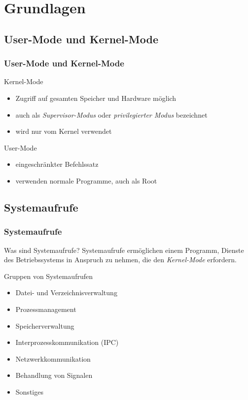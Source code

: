 \section{Grundlagen}

\subsection{User-Mode und Kernel-Mode}

\begin{frame}
  \frametitle{User-Mode und Kernel-Mode}

  \begin{block}{Kernel-Mode}
    \begin{itemize}
      \item Zugriff auf gesamten Speicher und Hardware möglich
      \item auch als \emph{Supervisor-Modus} oder \emph{privilegierter Modus} bezeichnet
      \item wird nur vom Kernel verwendet
    \end{itemize}
  \end{block}

  \begin{block}{User-Mode}
    \begin{itemize}
      \item eingeschränkter Befehlssatz
      \item verwenden normale Programme, auch als Root
    \end{itemize}
  \end{block}
\end{frame}

\subsection{Systemaufrufe}

\begin{frame}
  \frametitle{Systemaufrufe}

  \begin{block}{Was sind Systemaufrufe?}
    Systemaufrufe ermöglichen einem Programm, Dienste des Betriebssystems in Anspruch zu nehmen,
    die den \emph{Kernel-Mode} erfordern.
  \end{block}
  
  \begin{block}{Gruppen von Systemaufrufen}

    \begin{itemize}
      \item Datei- und Verzeichnisverwaltung
      \item Prozessmanagement
      \item Speicherverwaltung
      \item Interprozesskommunikation (IPC)
      \item Netzwerkkommunikation
      \item Behandlung von Signalen
      \item Sonstiges
    \end{itemize}
  \end{block}

\end{frame}

